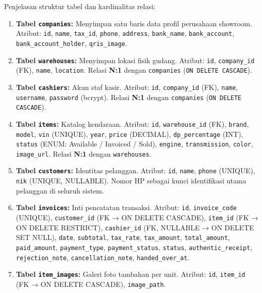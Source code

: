 \documentclass[11pt, a5paper]{article}
\begin{document}
Penjelasan struktur tabel dan kardinalitas relasi:

\begin{enumerate}[label=\arabic*.]
  \item \textbf{Tabel \texttt{companies}:} Menyimpan satu baris data profil
        perusahaan showroom. Atribut: \texttt{id}, \texttt{name},
        \texttt{tax\_id}, \texttt{phone}, \texttt{address},
        \texttt{bank\_name}, \texttt{bank\_account},
        \texttt{bank\_account\_holder}, \texttt{qris\_image}.

  \item \textbf{Tabel \texttt{warehouses}:} Menyimpan lokasi fisik gudang.
        Atribut: \texttt{id}, \texttt{company\_id} (FK), \texttt{name},
        \texttt{location}. Relasi \textbf{N:1} dengan \texttt{companies}
        (\texttt{ON DELETE CASCADE}).

  \item \textbf{Tabel \texttt{cashiers}:} Akun staf kasir. Atribut:
        \texttt{id}, \texttt{company\_id} (FK), \texttt{name},
        \texttt{username}, \texttt{password} (bcrypt). Relasi \textbf{N:1}
        dengan \texttt{companies} (\texttt{ON DELETE CASCADE}).

  \item \textbf{Tabel \texttt{items}:} Katalog kendaraan. Atribut: \texttt{id},
        \texttt{warehouse\_id} (FK), \texttt{brand}, \texttt{model},
        \texttt{vin} (UNIQUE), \texttt{year}, \texttt{price} (DECIMAL),
        \texttt{dp\_percentage} (INT), \texttt{status} (ENUM: Available /
        Invoiced / Sold), \texttt{engine}, \texttt{transmission},
        \texttt{color}, \texttt{image\_url}. Relasi \textbf{N:1} dengan
        \texttt{warehouses}.

  \item \textbf{Tabel \texttt{customers}:} Identitas pelanggan. Atribut:
        \texttt{id}, \texttt{name}, \texttt{phone} (UNIQUE), \texttt{nik}
        (UNIQUE, NULLABLE). Nomor HP sebagai kunci identifikasi utama
        pelanggan di seluruh sistem.

  \item \textbf{Tabel \texttt{invoices}:} Inti pencatatan transaksi. Atribut:
        \texttt{id}, \texttt{invoice\_code} (UNIQUE), \texttt{customer\_id}
        (FK → ON DELETE CASCADE), \texttt{item\_id}
        (FK → ON DELETE RESTRICT), \texttt{cashier\_id}
        (FK, NULLABLE → ON DELETE SET NULL), \texttt{date},
        \texttt{subtotal}, \texttt{tax\_rate}, \texttt{tax\_amount},
        \texttt{total\_amount}, \texttt{paid\_amount}, \texttt{payment\_type},
        \texttt{payment\_status}, \texttt{status}, \texttt{authentic\_receipt},
        \texttt{rejection\_note}, \texttt{cancellation\_note},
        \texttt{handed\_over\_at}.

  \item \textbf{Tabel \texttt{item\_images}:} Galeri foto tambahan per unit.
        Atribut: \texttt{id}, \texttt{item\_id} (FK → ON DELETE CASCADE),
        \texttt{image\_path}.
\end{enumerate}
\end{document}
